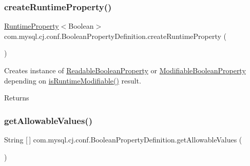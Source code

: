 \subsubsection{\texorpdfstring{create\+Runtime\+Property()}{createRuntimeProperty()}}
{\footnotesize\ttfamily \mbox{\hyperlink{interfacecom_1_1mysql_1_1cj_1_1conf_1_1_runtime_property}{Runtime\+Property}}$<$Boolean$>$ com.\+mysql.\+cj.\+conf.\+Boolean\+Property\+Definition.\+create\+Runtime\+Property (\begin{DoxyParamCaption}{ }\end{DoxyParamCaption})}

Creates instance of \mbox{\hyperlink{classcom_1_1mysql_1_1cj_1_1conf_1_1_readable_boolean_property}{Readable\+Boolean\+Property}} or \mbox{\hyperlink{classcom_1_1mysql_1_1cj_1_1conf_1_1_modifiable_boolean_property}{Modifiable\+Boolean\+Property}} depending on \mbox{\hyperlink{classcom_1_1mysql_1_1cj_1_1conf_1_1_abstract_property_definition_a6c98140b2db84ccd0ff29ce165ec9ef5}{is\+Runtime\+Modifiable()}} result.

\begin{DoxyReturn}{Returns}

\end{DoxyReturn}
\mbox{\label{classcom_1_1mysql_1_1cj_1_1conf_1_1_boolean_property_definition_ad456fe5acb34798b759e12aad98cb0b9}} 
\subsubsection{\texorpdfstring{get\+Allowable\+Values()}{getAllowableValues()}}
{\footnotesize\ttfamily String \mbox{[}$\,$\mbox{]} com.\+mysql.\+cj.\+conf.\+Boolean\+Property\+Definition.\+get\+Allowable\+Values (\begin{DoxyParamCaption}{ }\end{DoxyParamCaption})}

\mbox{\label{classcom_1_1mysql_1_1cj_1_1conf_1_1_boolean_property_definition_a8e046d48d44a9e26469191e21df2efdc}} 
